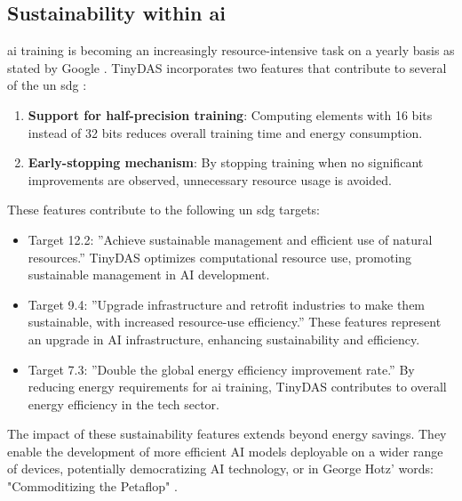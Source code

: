 \subsection{Sustainability within \acrshort{ai}}
\acrshort{ai} training is becoming an increasingly resource-intensive task on a yearly basis as stated by Google \cite{9499913}. TinyDAS incorporates two features that contribute to several of the \acrfull{un} \acrfull{sdg} \cite{UNSDGs}:
\begin{enumerate}
\item \textbf{Support for half-precision training}: Computing elements with 16 bits instead of 32 bits reduces overall training time and energy consumption.
\item \textbf{Early-stopping mechanism}: By stopping training when no significant improvements are observed, unnecessary resource usage is avoided.
\end{enumerate}
These features contribute to the following \acrshort{un} \acrshort{sdg} targets:
\begin{itemize}
\item Target 12.2: ''Achieve sustainable management and efficient use of natural resources.'' TinyDAS optimizes computational resource use, promoting sustainable management in AI development.
\item Target 9.4: ''Upgrade infrastructure and retrofit industries to make them sustainable, with increased resource-use efficiency.'' These features represent an upgrade in AI infrastructure, enhancing sustainability and efficiency.
\item Target 7.3: ''Double the global energy efficiency improvement rate.'' By reducing energy requirements for \acrshort{ai} training, TinyDAS contributes to overall energy efficiency in the tech sector.
\end{itemize}

The impact of these sustainability features extends beyond energy savings. They enable the development of more efficient AI models deployable on a wider range of devices, potentially democratizing AI technology, or in George Hotz' words: "Commoditizing the Petaflop" \cite{hotz2024commoditizing}. 
